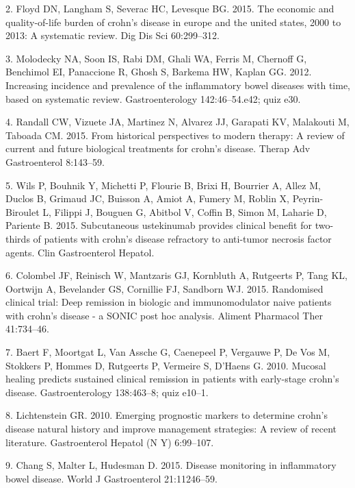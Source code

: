 \documentclass[11pt,]{article}
\begin{document}
\hypertarget{ref-floyd_economicburden_2015}{}
2. Floyd DN, Langham S, Severac HC, Levesque BG. 2015. The economic and
quality-of-life burden of crohn's disease in europe and the united
states, 2000 to 2013: A systematic review. Dig Dis Sci 60:299--312.

\hypertarget{ref-molodecky_increasingIBD_2012}{}
3. Molodecky NA, Soon IS, Rabi DM, Ghali WA, Ferris M, Chernoff G,
Benchimol EI, Panaccione R, Ghosh S, Barkema HW, Kaplan GG. 2012.
Increasing incidence and prevalence of the inflammatory bowel diseases
with time, based on systematic review. Gastroenterology 142:46--54.e42;
quiz e30.

\hypertarget{ref-randall_CDbiologics_2015}{}
4. Randall CW, Vizuete JA, Martinez N, Alvarez JJ, Garapati KV,
Malakouti M, Taboada CM. 2015. From historical perspectives to modern
therapy: A review of current and future biological treatments for
crohn's disease. Therap Adv Gastroenterol 8:143--59.

\hypertarget{ref-wils_ust_2015}{}
5. Wils P, Bouhnik Y, Michetti P, Flourie B, Brixi H, Bourrier A, Allez
M, Duclos B, Grimaud JC, Buisson A, Amiot A, Fumery M, Roblin X,
Peyrin-Biroulet L, Filippi J, Bouguen G, Abitbol V, Coffin B, Simon M,
Laharie D, Pariente B. 2015. Subcutaneous ustekinumab provides clinical
benefit for two-thirds of patients with crohn's disease refractory to
anti-tumor necrosis factor agents. Clin Gastroenterol Hepatol.

\hypertarget{ref-colombel_deepremission_2015}{}
6. Colombel JF, Reinisch W, Mantzaris GJ, Kornbluth A, Rutgeerts P, Tang
KL, Oortwijn A, Bevelander GS, Cornillie FJ, Sandborn WJ. 2015.
Randomised clinical trial: Deep remission in biologic and
immunomodulator naive patients with crohn's disease - a SONIC post hoc
analysis. Aliment Pharmacol Ther 41:734--46.

\hypertarget{ref-baert_mucosalhealing_2010}{}
7. Baert F, Moortgat L, Van Assche G, Caenepeel P, Vergauwe P, De Vos M,
Stokkers P, Hommes D, Rutgeerts P, Vermeire S, D'Haens G. 2010. Mucosal
healing predicts sustained clinical remission in patients with
early-stage crohn's disease. Gastroenterology 138:463--8; quiz e10--1.

\hypertarget{ref-Lichtenstein_biomarkers_2010}{}
8. Lichtenstein GR. 2010. Emerging prognostic markers to determine
crohn's disease natural history and improve management strategies: A
review of recent literature. Gastroenterol Hepatol (N Y) 6:99--107.

\hypertarget{ref-Chang_biomarkers_2015}{}
9. Chang S, Malter L, Hudesman D. 2015. Disease monitoring in
inflammatory bowel disease. World J Gastroenterol 21:11246--59.
\end{document}
